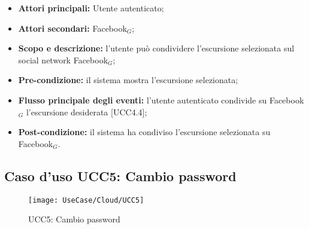 \begin{itemize}
\item \textbf{Attori principali:} Utente autenticato;
\item \textbf{Attori secondari:} Facebook$_{G}$;
\item \textbf{Scopo e descrizione:} l'utente può condividere l'escursione selezionata sul social network Facebook$_{G}$;
\item \textbf{Pre-condizione:} il sistema mostra l'escursione selezionata;
\item \textbf{Flusso principale degli eventi:} l'utente autenticato condivide su Facebook$_{G}$ l'escursione  desiderata [UCC4.4];
\item \textbf{Post-condizione:} il sistema ha condiviso l'escursione selezionata su Facebook$_{G}$. 
\end{itemize}

\subsection{Caso d'uso UCC5: Cambio password}

\begin{figure}[H]
\centering
\texttt{[image: UseCase/Cloud/UCC5]}
\caption{UCC5: Cambio password}
\end{figure}

